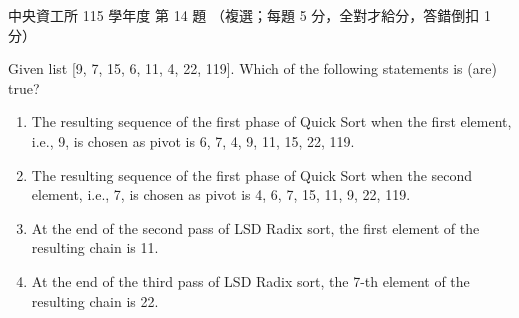 \begin{pastexam}[label={px:ncu-115-dsa-14}]{中央資工所 115 學年度 第 14 題}
（複選；每題 5 分，全對才給分，答錯倒扣 1 分）

Given list [9, 7, 15, 6, 11, 4, 22, 119]. Which of the following statements is (are) true?
\begin{enumerate}[label=\Alph*.]
\item The resulting sequence of the first phase of Quick Sort when the first element, i.e., 9, is chosen as pivot is 6, 7, 4, 9, 11, 15, 22, 119.
\item The resulting sequence of the first phase of Quick Sort when the second element, i.e., 7, is chosen as pivot is 4, 6, 7, 15, 11, 9, 22, 119.
\item At the end of the second pass of LSD Radix sort, the first element of the resulting chain is 11.
\item At the end of the third pass of LSD Radix sort, the 7-th element of the resulting chain is 22.
\end{enumerate}
\end{pastexam}

